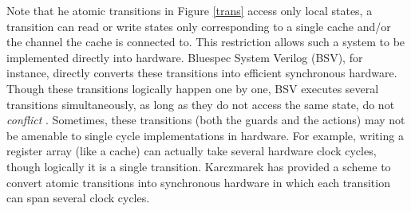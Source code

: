 Note that he atomic transitions in Figure \ref{trans} access only local states,
\ie a transition can read or write states only corresponding to a single cache
and/or the channel the cache is connected to. This restriction allows such a
system to be implemented directly into hardware. Bluespec System Verilog (BSV),
for instance, directly converts these transitions into efficient synchronous
hardware. Though these transitions logically happen one by one, BSV executes
several transitions simultaneously, as long as they do not access the same
state, \ie do not \emph{conflict} \cite{Hoe:TCAD,HoeArvind:TRSSynthesis1}.
Sometimes, these transitions (both the guards and the actions) may not be
amenable to single cycle implementations in hardware. For example, writing a
register array (like a cache) can actually take several hardware clock cycles,
though logically it is a single transition.  Karczmarek \etal \cite{Karczmarek}
has provided a scheme to convert atomic transitions into synchronous hardware
in which each transition can span several clock cycles.

